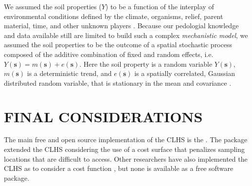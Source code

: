 We assumed the soil properties ($Y$) to be a function of the interplay of environmental conditions defined by 
the climate, organisms, relief, parent material, time, and other unknown players \cite{Jenny1994, 
McBratneyEtAl2003, Florinsky2012}. Because our pedologial knowledge and data available still are limited to 
build such a complex \emph{mechanistic model}, we assumed the soil properties to be the outcome of a spatial 
stochastic process composed of the additive combination of fixed and random effects, i.e. $Y(\boldsymbol{s}) = 
m(\boldsymbol{s}) + e(\boldsymbol{s})$. Here the soil property is a random variable $Y(\boldsymbol{s})$, 
$m(\boldsymbol{s})$ is a deterministic trend, and $e(\boldsymbol{s})$ is a spatially correlated, Gaussian 
distributed random variable, that is stationary in the mean and covariance \cite{HeuvelinkEtAl2001}.




\section{FINAL CONSIDERATIONS}

The main free and open source implementation of the CLHS is the  \cite{RoudierEtAl2012}. The 
package extended the CLHS considering the use of a cost surface that penalizes sampling locations that are 
difficult to access. Other researchers have also implemented the CLHS as to consider a cost function 
\cite{MulderEtAl2013, CliffordEtAl2014}, but none is available as a free software package.
